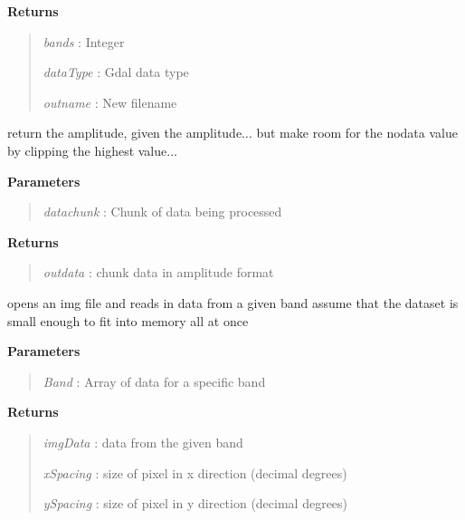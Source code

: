 \documentclass[letterpaper,10pt,openany,oneside]{sphinxmanual}
\begin{document}
\begin{fulllineitems}
\begin{fulllineitems}
\textbf{Returns}
\begin{quote}

\emph{bands}    : Integer

\emph{dataType} : Gdal data type

\emph{outname}  : New filename
\end{quote}

\end{fulllineitems}


\begin{fulllineitems}
\label{code:Image.Image.getAmp}
return the amplitude, given the amplitude... but make room for
the nodata value by clipping the highest value...

\textbf{Parameters}
\begin{quote}

\emph{datachunk} : Chunk of data being processed
\end{quote}

\textbf{Returns}
\begin{quote}

\emph{outdata} : chunk data in amplitude format
\end{quote}

\end{fulllineitems}


\begin{fulllineitems}
\label{code:Image.Image.getBandData}
opens an img file and reads in data from a given band
assume that the dataset is small enough to fit into memory all at once

\textbf{Parameters}
\begin{quote}

\emph{Band} : Array of data for a specific band
\end{quote}

\textbf{Returns}
\begin{quote}

\emph{imgData}  : data from the given band

\emph{xSpacing} : size of pixel in x direction (decimal degrees)

\emph{ySpacing} : size of pixel in y direction (decimal degrees)
\end{quote}


\end{fulllineitems}
\end{fulllineitems}
\end{document}
